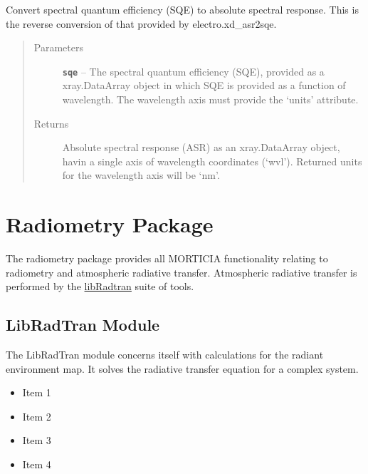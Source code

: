 \documentclass[a4paper,10pt,english]{sphinxmanual}
\begin{document}
\begin{fulllineitems}
\label{packages:electro.xd_sqe2asr}
Convert spectral quantum efficiency (SQE) to absolute spectral response.
This is the reverse conversion of that provided by electro.xd\_asr2sqe.
\begin{quote}\begin{description}
\item[{Parameters}] \leavevmode
\textbf{\texttt{sqe}} -- The spectral quantum efficiency (SQE), provided as a xray.DataArray object in which SQE is
provided as a function of wavelength. The wavelength axis must provide the `units' attribute.

\item[{Returns}] \leavevmode
Absolute spectral response (ASR) as an xray.DataArray object, havin a single axis of wavelength
coordinates (`wvl'). Returned units for the wavelength axis will be `nm'.

\end{description}\end{quote}

\end{fulllineitems}



\section{Radiometry Package}
\label{packages:id4}\label{packages:radiometry-package}
The radiometry package provides all MORTICIA functionality relating to radiometry and atmospheric radiative transfer.
Atmospheric radiative transfer is performed by the \href{http://www.libradtran.org}{libRadtran} suite of tools.


\subsection{LibRadTran Module}
\label{packages:librad-module}\label{packages:libradtran-module}
The LibRadTran module concerns itself with calculations for the radiant environment map. It solves the radiative transfer equation for a complex system.
\begin{itemize}
\item {} 
Item 1

\item {} 
Item 2

\item {} 
Item 3

\item {} 
Item 4

\end{itemize}
\label{packages:module-librad}
\end{document}
